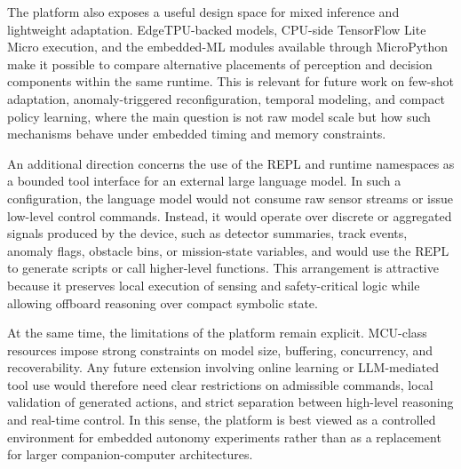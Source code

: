 The platform also exposes a useful design space for mixed inference and
lightweight adaptation. EdgeTPU-backed models, CPU-side TensorFlow Lite
Micro execution, and the embedded-ML modules available through
MicroPython make it possible to compare alternative placements of
perception and decision components within the same runtime. This is
relevant for future work on few-shot adaptation, anomaly-triggered
reconfiguration, temporal modeling, and compact policy learning, where
the main question is not raw model scale but how such mechanisms behave
under embedded timing and memory constraints.

An additional direction concerns the use of the REPL and runtime
namespaces as a bounded tool interface for an external large language
model. In such a configuration, the language model would not consume raw
sensor streams or issue low-level control commands. Instead, it would
operate over discrete or aggregated signals produced by the device, such
as detector summaries, track events, anomaly flags, obstacle bins, or
mission-state variables, and would use the REPL to generate scripts or
call higher-level functions. This arrangement is attractive because it
preserves local execution of sensing and safety-critical logic while
allowing offboard reasoning over compact symbolic state.

At the same time, the limitations of the platform remain explicit.
MCU-class resources impose strong constraints on model size, buffering,
concurrency, and recoverability. Any future extension involving online
learning or LLM-mediated tool use would therefore need clear
restrictions on admissible commands, local validation of generated
actions, and strict separation between high-level reasoning and
real-time control. In this sense, the platform is best viewed as a
controlled environment for embedded autonomy experiments rather than as
a replacement for larger companion-computer architectures.
